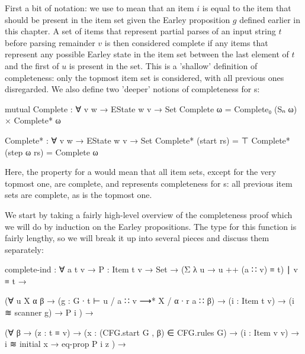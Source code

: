 		First a bit of notation: we use  to mean that an item $i$
		is equal to the item that should be present in the item set given the
		Earley proposition $g$ defined earlier in this chapter. A set of items
		that represent partial parses of an input string $t$ before parsing
		remainder $v$ is then considered complete if any items that represent
		any possible Earley state in the item set between the last element of
		$t$ and the first of $u$ is present in the set. This is a 'shallow'
		definition of completeness: only the topmost item set is considered,
		with all previous ones disregarded. We also define two 'deeper' notions of
		completeness for s:

		\begin{code}
			  mutual
			    Complete : ∀ {v w} → EState w v → Set
			    Complete ω = Complete₀ (Sₙ ω) × Complete* ω
			  
			    Complete* : ∀ {v w} → EState w v → Set
			    Complete* (start rs) = ⊤
			    Complete* (step ω rs) = Complete ω
		\end{code}

		Here, the  property for a  would mean
		that all item sets, except for the very topmost one, are complete, and
		 represents completeness for s: all
		previous item sets are complete, as is the topmost one.

		We start by taking a fairly high-level overview of the completeness
		proof which we will do by induction on the Earley propositions. The
		type for this function is fairly lengthy, so we will break it up into
		several pieces and discuss them separately:

		\begin{code}
			  complete-ind : ∀ {a t v} →
			    {P : Item t v → Set} →
			    (Σ λ u → u ++ (a ∷ v) ≡ t) ∣ v ≡ t →
			
			    (∀ {u X α β} →
			      (g : G ∙ t ⊢ u / a ∷ v ⟶* X / α ∙ r a ∷ β) →
			      (i : Item t v) → (i ≋ scanner g) →
			      P i
			    ) →
			
			    (∀ {β} →
			      (z : t ≡ v) →
			      (x : (CFG.start G , β) ∈ CFG.rules G) →
			      (i : Item v v) →
			      i ≋ initial x → eq-prop P i z
			    ) →
		\end{code}


